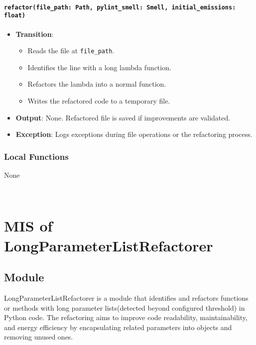 \documentclass[12pt, titlepage]{article}
\begin{document}
\paragraph{\texttt{refactor(file\_path: Path, pylint\_smell: Smell, initial\_emissions: float)}}
\begin{itemize}
  \item \textbf{Transition}:
    \begin{itemize}
    \item Reads the file at \texttt{file\_path}.
    \item Identifies the line with a long lambda function.
    \item Refactors the lambda into a normal function.
    \item Writes the refactored code to a temporary file.
    \end{itemize}
  \item \textbf{Output}: None. Refactored file is saved if improvements are validated.
  \item \textbf{Exception}: Logs exceptions during file operations or the refactoring process.
\end{itemize}

\subsubsection{Local Functions}
None

~\newpage






\section{MIS of LongParameterListRefactorer} \label{Module} 



\subsection{Module}

LongParameterListRefactorer is a module that identifies and refactors functions or methods with long parameter lists(detected beyond configured threshold) in Python code. The refactoring aims to improve code readability, maintainability, and energy efficiency by encapsulating related parameters into objects and removing unused ones.
\end{document}
